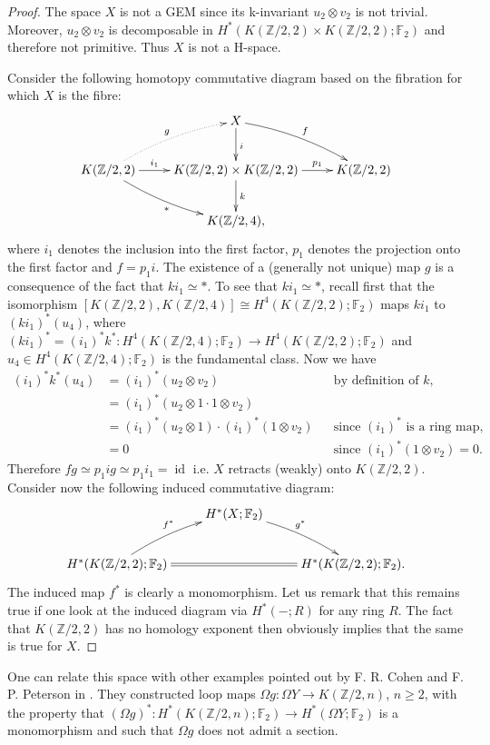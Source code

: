 \documentclass{amsart}
\theoremstyle{definition}
\theoremstyle{remark}
\DeclareMathOperator{\id}{id}
\newcommand{\Z}{\mathbb{Z}}
\newcommand{\F}{\mathbb{F}}
\renewcommand{\geq}{\geqslant}
\begin{document}
\begin{proof}
The space $X$ is not a GEM since its k-invariant $u_2\otimes v_2$ is not trivial. Moreover, $u_2\otimes v_2$ is decomposable in $H^*(K(\Z/2,2)\times K(\Z/2,2);\F_2)$ and therefore not primitive. Thus $X$ is not a H-space. 

Consider the following homotopy commutative diagram based on the fibration for which $X$ is the fibre:
$$\xymatrix{
&X\ar[d]^i\ar@/^/[rd]^f\\
K(\Z/2,2)\ar[r]^-{i_1}\ar@/^/@{.>}[ru]^g\ar@/_/[rd]_{*} &K(\Z/2,2)\times K(\Z/2,2)\ar[r]^-{p_1}\ar[d]^k &K(\Z/2,2)\\
&K(\Z/2,4),
}$$ where $i_1$ denotes the inclusion into the first factor, $p_1$ denotes the projection onto the first factor and $f=p_1i$. The existence of a (generally not unique) map $g$ is a consequence of the fact that $k i_1\simeq*$. To see that $k i_1\simeq*$, recall first that the isomorphism $[K(\Z/2,2),K(\Z/2,4)]\cong H^4(K(\Z/2,2);\F_2)$ maps $ki_1$ to $(ki_1)^*(u_4)$, where $(ki_1)^*=(i_1)^*k^*:H^4(K(\Z/2,4);\F_2)\to H^4(K(\Z/2,2);\F_2)$ and $u_4\in H^4(K(\Z/2,4);\F_2)$ is the fundamental class. Now we have 
\begin{align*}
(i_1)^*k^*(u_4) &=(i_1)^*(u_2\otimes v_2) &&\text{by definition of $k$,}\\
&=(i_1)^*(u_2\otimes1\cdot1\otimes v_2)\\
&=(i_1)^*(u_2\otimes1)\cdot(i_1)^*(1\otimes v_2) &&\text{since $(i_1)^*$ is a ring map,}\\
&=0 &&\text{since $(i_1)^*(1\otimes v_2)=0$.}
\end{align*}
Therefore $fg\simeq p_1ig\simeq p_1i_1=\id$ i.e. $X$ retracts (weakly) onto $K(\Z/2,2)$. Consider now the following induced commutative diagram:
$$\xymatrix{
&H^*(X;\F_2)\ar@/^/[rd]^{g^*}\\
H^*(K(\Z/2,2);\F_2)\ar@/^/[ru]^{f^*}\ar@{=}[rr] &&H^*(K(\Z/2,2);\F_2).
}$$ The induced map $f^*$ is clearly a monomorphism. Let us remark that this remains true if one look at the induced diagram via $H^*(-;R)$ for any ring $R$. The fact that $K(\Z/2,2)$ has no homology exponent then obviously implies that the same is true for $X$.
\end{proof}

\newpage
One can relate this space with other examples pointed out by F. R. Cohen and F. P. Peterson in \cite{CP00}. They constructed loop maps $\Omega g:\Omega Y\to K(\Z/2,n)$, $n\geq2$, with the property that $(\Omega g)^*:H^*(K(\Z/2,n);\F_2)\to H^*(\Omega Y;\F_2)$ is a monomorphism and such that $\Omega g$ does not admit a section. 
\end{document}
